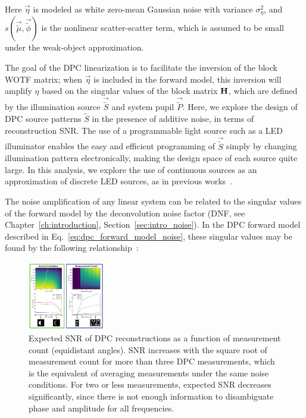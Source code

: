 \noindent Here $\vec{\eta}$ is modeled as white zero-mean Gaussian noise with variance $\sigma_{\eta}^2$, and $s(\vec{\tilde{\mu}}, \vec{\tilde{\phi}})$ is the nonlinear scatter-scatter term, which is assumed to be small under the weak-object approximation.

The goal of the DPC linearization is to facilitate the inversion of the block WOTF matrix; when $\vec{\eta}$ is included in the forward model, this inversion will amplify $\eta$ based on the singular values of the block matrix $\mathbf{H}$, which are defined by the illumination source $\vec{\tilde{S}}$ and system pupil $\vec{\tilde{P}}$. Here, we explore the design of DPC source patterns $\tilde{S}$ in the presence of additive noise, in terms of reconstruction SNR. The use of a programmable light source such as a LED illuminator enables the easy and efficient programming of $\vec{\tilde{S}}$ simply by changing illumination pattern electronically, making the design space of each source quite large. In this analysis, we explore the use of continuous sources as an approximation of discrete LED sources, as in previous works~\cite{tian2015quantitative, Phillips:17}.


The noise amplification of any linear system can be related to the singular values of the forward model by the deconvolution noise factor (DNF, see Chapter~\ref{ch:introduction}, Section~\ref{sec:intro_noise}). In the DPC forward model described in Eq.~\ref{eq:dpc_forward_model_noise}, these singular values may be found by the following relationship~\cite{silvester2000determinants}:

\begin{figure}
  \label{fig:phase:dpc_measurement_count}
  \begin{center}
    \includegraphics[width=0.3\textwidth]{figures/fig_phase_dpc_optimization_meas.pdf}
  \end{center}
  \caption{Expected SNR of DPC reconstructions as a function of measurement count (equidistant angles). SNR increases with the square root of measurement count for more than three DPC measurements, which is the equivalent of averaging measurements under the same noise conditions. For two or less measurements, expected SNR decreases significantly, since there is not enough information to disambiguate phase and amplitude for all frequencies.}
\end{figure}


